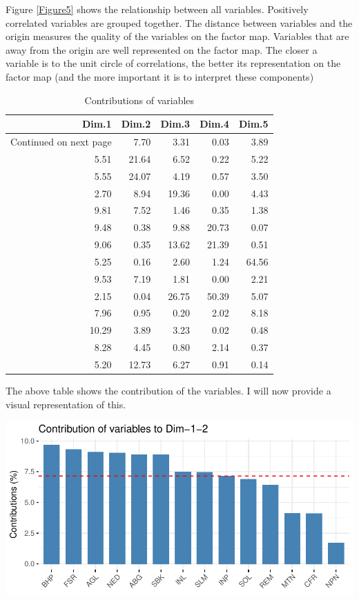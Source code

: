 \documentclass[11pt,preprint, authoryear]{elsarticle}
\let\origfigure\figure
\let\endorigfigure\endfigure
\renewenvironment{figure}[1][2] {
    \expandafter\origfigure\expandafter[H]
} {
    \endorigfigure
}
\numberwithin{equation}{section}
\numberwithin{figure}{section}
\numberwithin{table}{section}
\begin{document}
Figure \ref{Figure5} shows the relationship between all variables.
Positively correlated variables are grouped together. The distance
between variables and the origin measures the quality of the variables
on the factor map. Variables that are away from the origin are well
represented on the factor map. The closer a variable is to the unit
circle of correlations, the better its representation on the factor map
(and the more important it is to interpret these components)

\begingroup\fontsize{12pt}{13pt}\selectfont
\begin{longtable}{rrrrr}
\caption{Contributions of variables} \\ 
  \toprule
Dim.1 & Dim.2 & Dim.3 & Dim.4 & Dim.5 \\ 
  \hline 
\endhead 
\hline 
{\footnotesize Continued on next page} 
\endfoot 
\endlastfoot 
 \midrule
9.21 & 7.70 & 3.31 & 0.03 & 3.89 \\ 
  5.51 & 21.64 & 6.52 & 0.22 & 5.22 \\ 
  5.55 & 24.07 & 4.19 & 0.57 & 3.50 \\ 
  2.70 & 8.94 & 19.36 & 0.00 & 4.43 \\ 
  9.81 & 7.52 & 1.46 & 0.35 & 1.38 \\ 
  9.48 & 0.38 & 9.88 & 20.73 & 0.07 \\ 
  9.06 & 0.35 & 13.62 & 21.39 & 0.51 \\ 
  5.25 & 0.16 & 2.60 & 1.24 & 64.56 \\ 
  9.53 & 7.19 & 1.81 & 0.00 & 2.21 \\ 
  2.15 & 0.04 & 26.75 & 50.39 & 5.07 \\ 
  7.96 & 0.95 & 0.20 & 2.02 & 8.18 \\ 
  10.29 & 3.89 & 3.23 & 0.02 & 0.48 \\ 
  8.28 & 4.45 & 0.80 & 2.14 & 0.37 \\ 
  5.20 & 12.73 & 6.27 & 0.91 & 0.14 \\ 
   \bottomrule
\end{longtable}
\endgroup

The above table shows the contribution of the variables. I will now
provide a visual representation of this.

\begin{figure}[H]

{\centering \includegraphics{Question4_files/figure-latex/Figure6-1} 

}

\caption{Contributions \label{Figure6}}\label{fig:Figure6}
\end{figure}
\end{document}

